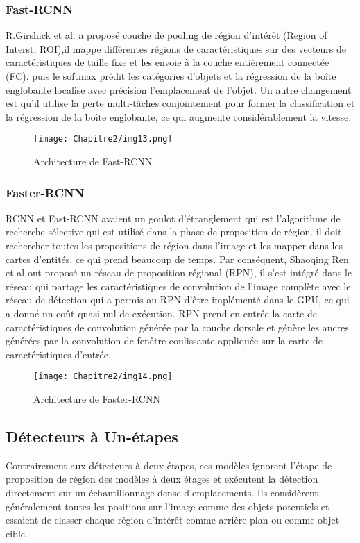      \subsubsection{Fast-RCNN} \cite{fast_rcnn_paper}
     R.Girshick et al. a proposé couche de pooling de région d'intérêt (Region of Interst, ROI),il mappe différentes régions de caractéristiques sur des vecteurs de caractéristiques de taille fixe et les envoie à la couche entièrement connectée (FC). puis le softmax prédit les catégories d'objets et la régression de la boîte englobante localise avec précision l'emplacement de l'objet. Un autre changement est qu'il utilise la perte multi-tâches conjointement pour former la classification et la régression de la boîte englobante, ce qui augmente considérablement la vitesse.
     \begin{figure}[H]
          \centering
          \texttt{[image: Chapitre2/img13.png]}
          \caption{Architecture de Fast-RCNN}
          \label{img13}
          \end{figure}

     \subsubsection{Faster-RCNN} \cite{faster_rcnn_paper}
     RCNN et Fast-RCNN avaient un goulot d'étranglement qui est l'algorithme de recherche sélective qui est utilisé dans la phase de proposition de région. il doit rechercher toutes les propositions de région dans l'image et les mapper dans les cartes d'entités, ce qui prend beaucoup de temps. Par conséquent, Shaoqing Ren et al ont proposé un réseau de proposition régional (RPN), il s'est intégré dans le réseau qui partage les caractéristiques de convolution de l'image complète avec le réseau de détection qui a permis au RPN d'être implémenté dans le GPU, ce qui a donné un coût quasi nul de exécution. RPN prend en entrée la carte de caractéristiques de convolution générée par la couche dorsale et génère les ancres générées par la convolution de fenêtre coulissante appliquée sur la carte de caractéristiques d'entrée.
     \begin{figure}[H]
          \centering
          \texttt{[image: Chapitre2/img14.png]}
          \caption{Architecture de Faster-RCNN}
          \label{img14}
          \end{figure}

     \subsection{Détecteurs à Un-étapes}
     Contrairement aux détecteurs à deux étapes, ces modèles ignorent l'étape de proposition de région des modèles à deux étages et exécutent la détection directement sur un échantillonnage dense d'emplacements. Ils considèrent généralement toutes les positions sur l'image comme des objets potentiels et essaient de classer chaque région d'intérêt comme arrière-plan ou comme objet cible.

